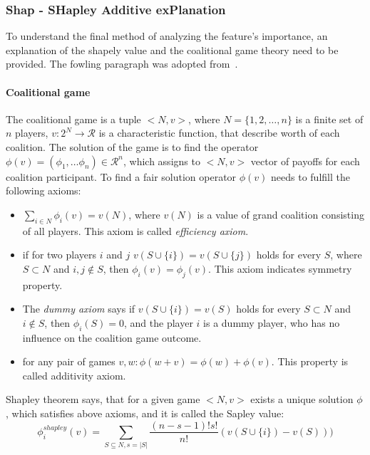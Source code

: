 \subsubsection{ Shap - SHapley Additive exPlanation }
\label{sec:shap}
To understand the final method of analyzing the feature's importance, an explanation of the shapely value and the coalitional game theory need to be provided. The fowling paragraph was adopted from~\cite{GameTheory}. 

\paragraph{Coalitional game} \mbox{}

The coalitional game is a tuple $<N,v>$, where $N=\{1,2,\ldots, n \}$ is a finite set of $n$ players, $v: 2^{N} \rightarrow \mathcal{R}$ is a characteristic function, that describe worth of each coalition. The solution of the game is to find the operator $\phi(v) = (\phi_{1}, \ldots \phi_n ) \in \mathcal{R}^n$, which assigns to $<N,v>$ vector of payoffs for each coalition participant. To find a fair solution operator $\phi(v)$ needs to fulfill the following axioms: 

\begin{itemize}
\item  $\sum_{i \in N} \phi_{i}(v)= v(N)$, where $v(N)$ is a value of grand coalition consisting of all players. This axiom is called \textit{efficiency axiom}. 
\item if for two players $i$ and $j$ $v(S\cup \{i\}) = v(S \cup \{j\})$ holds for every $S$, where $S \subset N$ and $i,j \notin S$, then $\phi_{i}(v)= \phi_{j}(v)$. This axiom indicates symmetry property. 
 \item The \textit{dummy axiom} says if $v(S\cup \{i\}) =v(S)$ holds for every $S \subset N$ and $i \notin S$, then $\phi_i(S) = 0$, and the player $i$ is a dummy player, who has no influence on the coalition game outcome. 
 \item for any pair of games $v,w: \phi(w+v)= \phi(w)+\phi(v)$. This property is called additivity axiom.   
\end{itemize}

Shapley theorem says, that for a given game $<N,v>$ exists a unique solution $\phi$, which satisfies above axioms, and it is called the Sapley value:
\begin{equation}\label{eq:shapley_value}
    \phi_{i}^{shapley}(v) = \sum_{S \subseteq N, s=|S|} \frac{(n-s-1)!s!}{n!}(v(S\cup \{i\}) - v(S)))
\end{equation}

